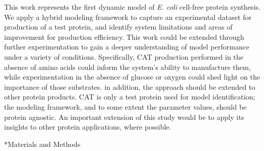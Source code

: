 \documentclass[12pt]{article}
\makeatletter
\renewcommand\section{\@startsection
	{subsection}{2}{0mm}
	{-0.2in}
	{0.05\baselineskip}
	{\normalfont\large\bfseries}}
\makeatother
\begin{document}

This work represents the first dynamic model of \textit{E. coli} cell-free protein synthesis.
We apply a hybrid modeling framework to capture an experimental dataset for production of a test protein, and identify system limitations and areas of improvement for production efficiency.
This work could be extended through further experimentation to gain a deeper understanding of model performance under a variety of conditions.
Specifically, CAT production performed in the absence of amino acids could inform the system's ability to manufacture them, while experimentation in the absence of glucose or oxygen could shed light on the importance of those substrates.
in addition, the approach should be extended to other protein products.
CAT is only a test protein used for model identification; the modeling framework, and to some extent the parameter values, should be protein agnostic.
An important extension of this study would be to apply its insights to other protein applications, where possible.

\clearpage

\section*{Materials and Methods}
\end{document}
